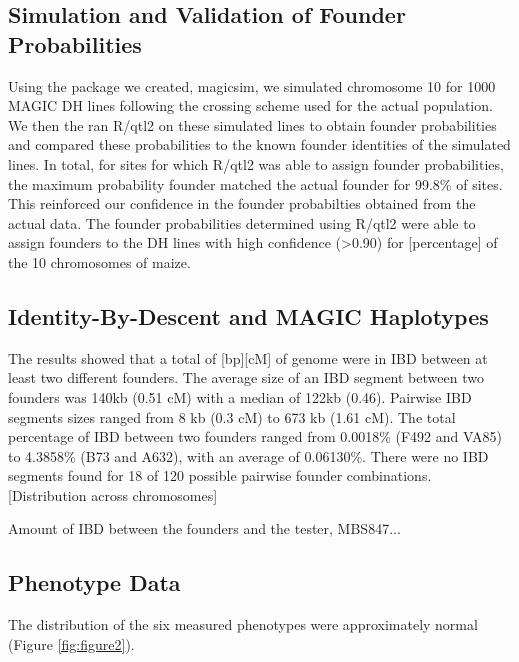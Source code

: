 \documentclass[article,9pt,twocolumn,twoside]{rilabRxiv}
\begin{document}
\subsection{Simulation and Validation of Founder Probabilities}
Using the package we created, magicsim, we simulated chromosome 10 for 1000 MAGIC DH lines following the crossing scheme used for the actual population. We then the ran R/qtl2 on these simulated lines to obtain founder probabilities and compared these probabilities to the known founder identities of the simulated lines. In total, for sites for which R/qtl2 was able to assign founder probabilities, the maximum probability founder matched the actual founder for 99.8\% of sites. This reinforced our confidence in the founder probabilties obtained from the actual data.
The founder probabilities determined using R/qtl2 were able to assign founders to the DH lines with high confidence (>0.90) for [percentage] of the 10 chromosomes of maize.

\subsection{Identity-By-Descent and MAGIC Haplotypes}
The results showed that a total of [bp][cM] of genome were in IBD between at
least two different founders. The average size of an IBD segment between two founders was 140kb (0.51 cM) with a median of 122kb (0.46). Pairwise IBD segments sizes ranged from 8 kb (0.3 cM) to  673 kb (1.61 cM). The total percentage of IBD between two founders ranged from 0.0018\% (F492 and VA85) to 4.3858\% (B73 and A632), with an average of 0.06130\%. There were no IBD segments found for 18 of 120 possible pairwise founder combinations.  [Distribution across chromosomes]

Amount of IBD between the founders and the tester, MBS847...


\subsection{Phenotype Data}
The distribution of the six measured phenotypes were approximately normal (Figure \ref{fig:figure2}).
\end{document}

